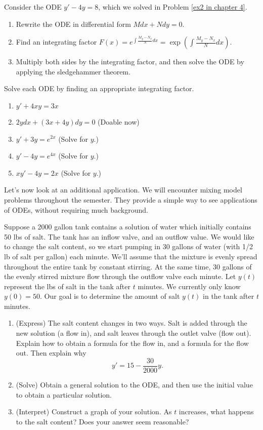 \begin{problem}
Consider the ODE $y'-4y=8$, which we solved in Problem \ref{ex2 in chapter 4}.  
\begin{enumerate}
 \item Rewrite the ODE in differential form $Mdx+Ndy=0$. 
 \item Find an integrating factor $F(x)=e^{\int \frac{M_y-N_x}{N} dx} = \exp\left(\int \frac{M_y-N_x}{N} dx\right).$
 \item Multiply both sides by the integrating factor, and then solve the ODE by applying the sledgehammer theorem.
\end{enumerate}
\end{problem}

\begin{problem}\label{solving ODEs by finding an integrating factor}
Solve each ODE by finding an appropriate integrating factor. 
\begin{enumerate}
 \item  $y'+4xy = 3x$
 \item  $2y dx+(3x+4y)dy=0$ (Doable now)
 \item  $y'+3y=e^{2x}$ (Solve for $y$.)
 \item  $y'-4y=e^{4x}$ (Solve for $y$.)
 \item  $xy'-4y=2x$ (Solve for $y$.)
\end{enumerate}
\end{problem}

Let's now look at an additional application. 
We will encounter mixing model problems throughout the semester. 
They provide a simple way to see applications of ODEs, without requiring much background. 
\begin{problem} 
Suppose a 2000 gallon tank contains a solution of water which initially contains 50 lbs of salt. The tank has an inflow valve, and an outflow value.  We would like to change the salt content, so we start pumping in 30 gallons of water (with 1/2 lb of salt per gallon) each minute. We'll assume that the mixture is evenly spread throughout the entire tank by constant stirring.  At the same time, 30 gallons of the evenly stirred mixture flow through the outflow valve each minute. Let $y(t)$ represent the lbs of salt in the tank after $t$ minutes. We currently only know $y(0)=50$. Our goal is to determine the amount of salt $y(t)$ in the tank after $t$ minutes.
\begin{enumerate}
 \item (Express)
 The salt content changes in two ways. Salt is added through the new solution (a flow in), and salt leaves through the outlet valve (flow out).  
 Explain how to obtain a formula for the flow in, and a formula for the flow out. Then explain why
$$y'=15-\frac{30}{2000}y.$$
 \item (Solve) Obtain a general solution to the ODE, and then use the initial value to obtain a particular solution.
 \item (Interpret) Construct a graph of your solution.  As $t$ increases, what happens to the salt content? Does your answer seem reasonable?
\end{enumerate}

\end{problem}

